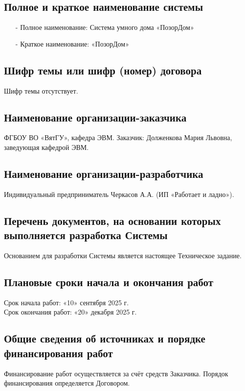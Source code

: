 \documentclass[oneside,a4paper,14pt]{extarticle}
\begin{document}
\subsection{Полное и краткое наименование системы}
\begin{itemize}
    \item[-] Полное наименование: Система умного дома «ПозорДом»
    \item[-] Краткое наименование: «ПозорДом»
\end{itemize}

\subsection{Шифр темы или шифр (номер) договора}
Шифр темы отсутствует.

\subsection{Наименование организации-заказчика}
ФГБОУ ВО «ВятГУ», кафедра ЭВМ.
Заказчик: Долженкова Мария Львовна, заведующая кафедрой ЭВМ.

\subsection{Наименование организации-разработчика}
Индивидуальный предприниматель Черкасов А.А. (ИП «Работает и ладно»).

\subsection{Перечень документов, на основании которых выполняется разработка Системы}
Основанием для разработки Системы является настоящее Техническое задание.

\subsection{Плановые сроки начала и окончания работ}
Срок начала работ: «10» сентября 2025 г.\\
Срок окончания работ: «20» декабря 2025 г.

\subsection{Общие сведения об источниках и порядке финансирования работ}
Финансирование работ осуществляется за счёт средств Заказчика. Порядок финансирования определяется Договором.
\end{document}
